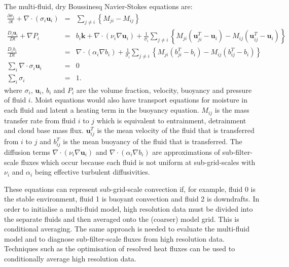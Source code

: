 \documentclass[11pt,a4paper]{article}
\begin{document}
The multi-fluid, dry Boussinesq Navier-Stokes equations \cite[approximated by][]{WMS20} are:
\begin{eqnarray}
\frac{\partial\sigma_{i}}{\partial t}+\nabla\cdot(\sigma_{i}\mathbf{u}_{i}) & = & \sum_{j\ne i}\left\{ M_{ji}-M{}_{ij}\right\} \label{eq:sigma}\\
\frac{D_{i}\mathbf{u}_{i}}{Dt}+\nabla P_{i} & = & b_{i}\mathbf{k}+\nabla\cdot\left( \nu_i\nabla\mathbf{u}_{i}\right)+\frac{1}{\sigma_{i}}\sum_{j\ne i}\left\{ M_{ji}\left(\mathbf{u}_{ji}^{T}-\mathbf{u}_{i}\right)-M_{ij}\left(\mathbf{u}_{ij}^{T}-\mathbf{u}_{i}\right)\right\} \label{eq:mom}\\
\frac{D_{i}b_{i}}{Dt} & = & \nabla\cdot \left(\alpha_i \nabla b_{i}\right)+\frac{1}{\sigma_{i}}\sum_{j\ne i}\left\{ M_{ji}\left(b_{ji}^{T}-b_{i}\right)-M_{ij}\left(b_{ij}^{T}-b_{i}\right)\right\} \label{eq:b}\\
\sum_{i}\nabla\cdot\sigma_{i}\mathbf{u}_{i} & = & 0\label{eq:divFree}\\
\sum_{i}\sigma_{i} & = & 1.\label{eq:sumOne}
\end{eqnarray}
where $\sigma_i$, $\mathbf{u}_i$, $b_i$ and $P_i$ are the volume fraction, velocity, buoyancy and pressure of fluid $i$. Moist equations would also have transport equations for moisture in each fluid and latent a heating term in the buoyancy equation. $M_{ij}$ is the mass transfer rate from fluid $i$ to $j$ which is equivalent to entrainment, detrainment and cloud base mass flux. $\mathbf{u}_{ij}^T$ is the mean velocity of the fluid that is transferred from $i$ to $j$ and $b_{ij}^T$ is the mean buoyancy of the fluid that is transferred. The diffusion terms $\nabla\cdot\left( \nu_i\nabla\mathbf{u}_{i}\right)$ and $\nabla\cdot \left(\alpha_i \nabla b_{i}\right)$ are approximations of sub-filter-scale fluxes which occur because each fluid is not uniform at sub-grid-scales with $\nu_i$ and $\alpha_i$ being effective turbulent diffusivities.

These equations can represent sub-grid-scale convection if, for example, fluid 0 is the stable environment, fluid 1 is buoyant convection and fluid 2 is downdrafts. In order to initialise a multi-fluid model, high resolution data must be divided into the separate fluids and then averaged onto the (coarser) model grid. This is conditional averaging. The same approach is needed to evaluate the multi-fluid model and to diagnose sub-filter-scale fluxes from high resolution data. Techniques such as the optimisation of resolved heat fluxes \cite[]{efstathiou2019b} can be used to conditionally average high resolution data.
\end{document}
